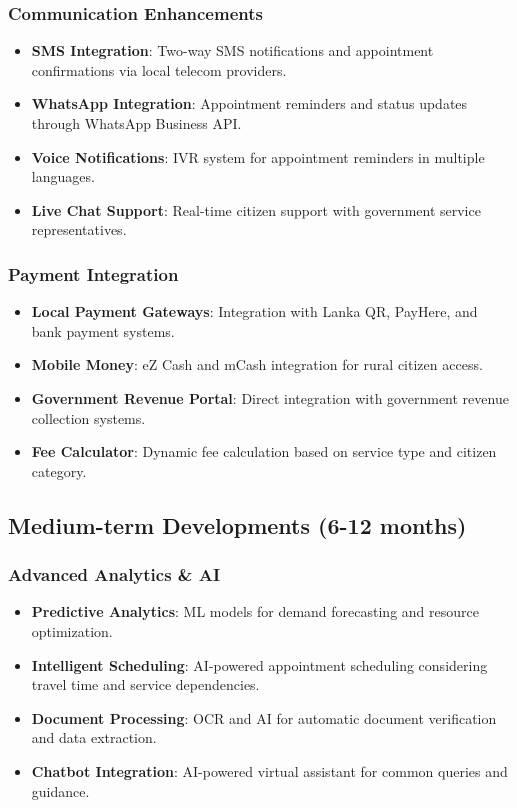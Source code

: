\documentclass[12pt,a4paper]{article}
\begin{document}
\subsubsection{Communication Enhancements}
\begin{itemize}[leftmargin=*]
    \item \textbf{SMS Integration}: Two-way SMS notifications and appointment confirmations via local telecom providers.
    \item \textbf{WhatsApp Integration}: Appointment reminders and status updates through WhatsApp Business API.
    \item \textbf{Voice Notifications}: IVR system for appointment reminders in multiple languages.
    \item \textbf{Live Chat Support}: Real-time citizen support with government service representatives.
\end{itemize}

\subsubsection{Payment Integration}
\begin{itemize}[leftmargin=*]
    \item \textbf{Local Payment Gateways}: Integration with Lanka QR, PayHere, and bank payment systems.
    \item \textbf{Mobile Money}: eZ Cash and mCash integration for rural citizen access.
    \item \textbf{Government Revenue Portal}: Direct integration with government revenue collection systems.
    \item \textbf{Fee Calculator}: Dynamic fee calculation based on service type and citizen category.
\end{itemize}

\subsection{Medium-term Developments (6-12 months)}

\subsubsection{Advanced Analytics \& AI}
\begin{itemize}[leftmargin=*]
    \item \textbf{Predictive Analytics}: ML models for demand forecasting and resource optimization.
    \item \textbf{Intelligent Scheduling}: AI-powered appointment scheduling considering travel time and service dependencies.
    \item \textbf{Document Processing}: OCR and AI for automatic document verification and data extraction.
    \item \textbf{Chatbot Integration}: AI-powered virtual assistant for common queries and guidance.
\end{itemize}
\end{document}
